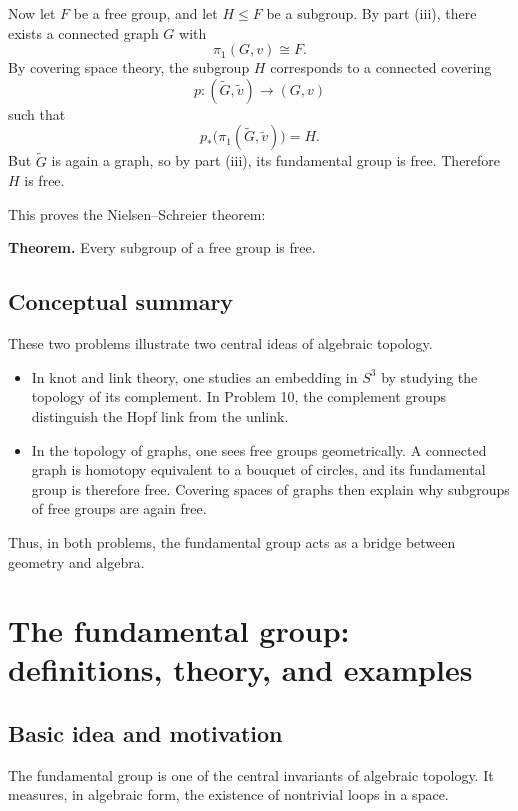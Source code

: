 \documentclass[12pt,a4paper]{article}
\theoremstyle{notespace}
\begin{document}
Now let \(F\) be a free group, and let \(H\leq F\) be a subgroup. By part (iii), there exists a connected graph \(G\) with
\[
\pi_1(G,v)\cong F.
\]
By covering space theory, the subgroup \(H\) corresponds to a connected covering
\[
p:(\widetilde G,\widetilde v)\to (G,v)
\]
such that
\[
p_*\bigl(\pi_1(\widetilde G,\widetilde v)\bigr)=H.
\]
But \(\widetilde G\) is again a graph, so by part (iii), its fundamental group is free. Therefore \(H\) is free.

This proves the Nielsen--Schreier theorem:

\medskip

\textbf{Theorem.}
Every subgroup of a free group is free.

\subsection{Conceptual summary}

These two problems illustrate two central ideas of algebraic topology.

\begin{itemize}
	\item In knot and link theory, one studies an embedding in \(S^3\) by studying the topology of its complement. In Problem 10, the complement groups distinguish the Hopf link from the unlink.
	
	\item In the topology of graphs, one sees free groups geometrically. A connected graph is homotopy equivalent to a bouquet of circles, and its fundamental group is therefore free. Covering spaces of graphs then explain why subgroups of free groups are again free.
\end{itemize}

Thus, in both problems, the fundamental group acts as a bridge between geometry and algebra.

\section{The fundamental group: definitions, theory, and examples}

\subsection{Basic idea and motivation}

The fundamental group is one of the central invariants of algebraic topology. It measures, in algebraic form, the existence of nontrivial loops in a space.
\end{document}
